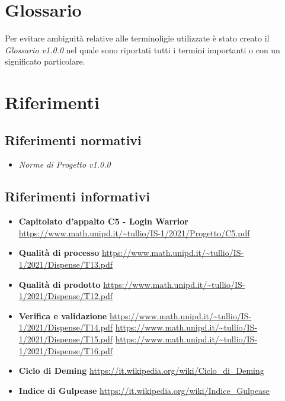 \section{Glossario}
Per evitare ambiguità relative alle terminoligie utilizzate è stato creato il \textit{Glossario v1.0.0} nel quale sono riportati tutti i termini importanti o con un significato particolare.
\section{Riferimenti}
\subsection{Riferimenti normativi}
\begin{itemize}
  \item \textit{Norme di Progetto v1.0.0}
\end{itemize}
\subsection{Riferimenti informativi}
\begin{itemize}
  \item \textbf{Capitolato d'appalto C5 - Login Warrior}
          \url{https://www.math.unipd.it/~tullio/IS-1/2021/Progetto/C5.pdf}
  \item \textbf{Qualità di processo}
          \url{https://www.math.unipd.it/~tullio/IS-1/2021/Dispense/T13.pdf}
  \item \textbf{Qualità di prodotto}
          \url{https://www.math.unipd.it/~tullio/IS-1/2021/Dispense/T12.pdf}
  \item \textbf{Verifica e validazione}
          \url{https://www.math.unipd.it/~tullio/IS-1/2021/Dispense/T14.pdf}
          \url{https://www.math.unipd.it/~tullio/IS-1/2021/Dispense/T15.pdf}
          \url{https://www.math.unipd.it/~tullio/IS-1/2021/Dispense/T16.pdf}
  \item \textbf{Ciclo di Deming}
          \url{https://it.wikipedia.org/wiki/Ciclo_di_Deming}
  \item \textbf{Indice di Gulpease}
          \url{https://it.wikipedia.org/wiki/Indice_Gulpease}
\end{itemize}

